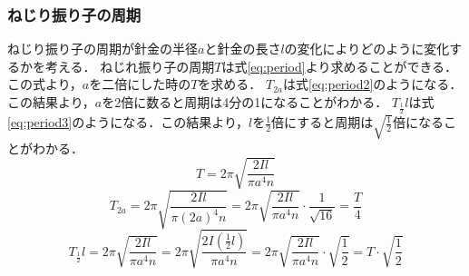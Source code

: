 \documentclass[a4paper,11pt]{ltjsarticle}
\begin{document}
\subsubsection{ねじり振り子の周期}
ねじり振り子の周期が針金の半径$a$と針金の長さ$l$の変化によりどのように変化するかを考える．
ねじれ振り子の周期$T$は式\eqref{eq:period}より求めることができる．この式より，$a$を二倍にした時の$T$を求める．
$T_{2a}$は式\eqref{eq:period2}のようになる．この結果より，$a$を2倍に数ると周期は4分の1になることがわかる．
$T_\frac{1}{2}l$は式\eqref{eq:period3}のようになる．この結果より，$l$を$\frac{1}{2}$倍にすると周期は$\sqrt{\frac{1}{2}}$倍になることがわかる．
\begin{equation}
  \label{eq:period}
  T = 2 \pi \sqrt{\frac{2Il}{\pi a^4 n}}
\end{equation}
\begin{equation}
  \label{eq:period2}
  T_{2a} = 2 \pi \sqrt{\frac{2Il}{\pi (2a)^4 n}} = 2 \pi \sqrt{\frac{2Il}{\pi a^4 n}} \cdot \frac{1}{\sqrt{16}} = \frac{T}{4}
\end{equation}
\begin{equation}
  \label{eq:period3}
  T_\frac{1}{2}l = 2 \pi \sqrt{\frac{2Il}{\pi a^4 n}} = 2 \pi \sqrt{\frac{2I(\frac{1}{2}l)}{\pi a^4 n}} = 2 \pi \sqrt{\frac{2Il}{\pi a^4 n}} \cdot \sqrt{\frac{1}{2}} = T \cdot \sqrt{\frac{1}{2}}
\end{equation}
\end{document}
